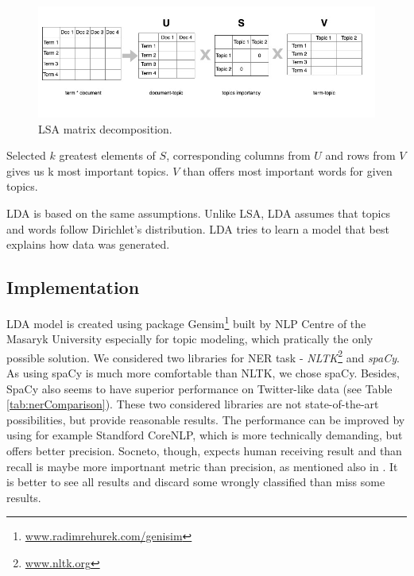 \begin{figure}[ht]
\centering
\includegraphics[width=1\textwidth]{diagrams/LSA.jpg}
\caption{
LSA matrix decomposition.}
\label{fig:svd}
\end{figure}
Selected $k$ greatest elements of $S$, corresponding columns from $U$ and rows from $V$ gives us k most important topics. $V$ than offers most important words for given topics.\par
LDA is based on the same assumptions. Unlike LSA, LDA assumes that topics and words follow Dirichlet's distribution. LDA tries to learn a model that best explains how data was generated.
\subsection{Implementation}
\label{sec:implementTM}
LDA model is created using package Gensim\footnote{\url{www.radimrehurek.com/genisim}} built by NLP Centre of the Masaryk University \cite{nlpcentre} especially for topic modeling, which pratically the only possible solution. We considered two libraries for NER task - \textit{NLTK}\footnote{\url{www.nltk.org}} and \textit{spaCy}. As using spaCy is much more comfortable than NLTK, we chose spaCy. Besides, SpaCy also seems to have superior performance on Twitter-like data \cite{TwitterNerComparison} (see Table \ref{tab:nerComparison}). These two considered libraries are not state-of-the-art possibilities, but provide reasonable results. The performance can be improved by using for example Standford CoreNLP, which is more technically demanding, but offers better precision. Socneto, though, expects human receiving result and than recall is maybe more importnant metric than precision, as mentioned also in \cite{TwitterNerComparison}. It is better to see all results and discard some wrongly classified than miss some results.

